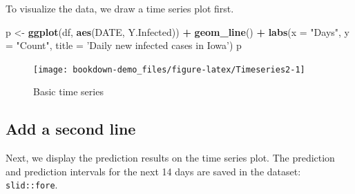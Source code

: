 \documentclass[]{book}
\newenvironment{Shaded}{\begin{snugshade}}{\end{snugshade}}
\newcommand{\KeywordTok}[1]{\textcolor[rgb]{0.13,0.29,0.53}{\textbf{#1}}}
\newcommand{\DataTypeTok}[1]{\textcolor[rgb]{0.13,0.29,0.53}{#1}}
\newcommand{\StringTok}[1]{\textcolor[rgb]{0.31,0.60,0.02}{#1}}
\newcommand{\OperatorTok}[1]{\textcolor[rgb]{0.81,0.36,0.00}{\textbf{#1}}}
\newcommand{\NormalTok}[1]{#1}
\begin{document}
\begin{Shaded}
\end{Shaded}

To visualize the data, we draw a time series plot first.

\begin{Shaded}
\begin{Highlighting}[]
\NormalTok{p <-}\StringTok{ }\KeywordTok{ggplot}\NormalTok{(df, }\KeywordTok{aes}\NormalTok{(DATE, Y.Infected)) }\OperatorTok{+}\StringTok{ }
\StringTok{  }\KeywordTok{geom_line}\NormalTok{() }\OperatorTok{+}\StringTok{ }
\StringTok{  }\KeywordTok{labs}\NormalTok{(}\DataTypeTok{x =} \StringTok{"Days"}\NormalTok{, }\DataTypeTok{y =} \StringTok{"Count"}\NormalTok{, }
       \DataTypeTok{title =} \StringTok{'Daily new infected cases in Iowa'}\NormalTok{) }
\NormalTok{p}
\end{Highlighting}
\end{Shaded}

\begin{figure}

{\centering \texttt{[image: bookdown-demo\_files/figure-latex/Timeseries2-1]} 

}

\caption{Basic time series}\label{fig:Timeseries2}
\end{figure}

\subsection{Add a second line}\label{add-a-second-line}

Next, we display the prediction results on the time series plot. The
prediction and prediction intervals for the next 14 days are saved in
the dataset: \texttt{slid::fore}.
\end{document}
